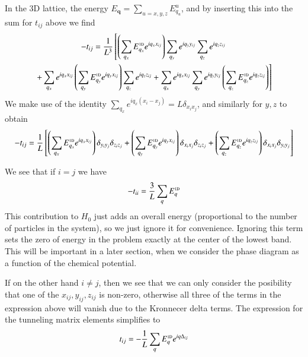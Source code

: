 \documentclass[oneside,11pt]{memoir}
\newcommand{\bv}[1]{\ensuremath{\bm{#1}}}
\begin{document}
In the 3D lattice, the energy $E_{\bv{q}} = \sum_{u=x,y,z} E_{q_{u}}^{u} $, and by inserting this into the sum for $t_{ij}$ above we find 
\begin{multline}
-t_{ij} =  \frac{1}{L^{3}} \left[ 
          \left(\sum_{q_{x}} E_{q_{x}}^{\text{\tiny 1D}}   e^{ i q_{x} x_{ij} }   \right)
          \sum_{q_{y}} e^{ i q_{y} y_{ij} }   
          \sum_{q_{z}} e^{ i q_{z} z_{ij} }  
   \right. \\
\left. 
          + 
          \sum_{q_{x}} e^{ i q_{x} x_{ij} }  
          \left(\sum_{q_{y}} E_{q_{y}}^{\text{\tiny 1D}}   e^{ i q_{y} x_{ij} }   \right)
          \sum_{q_{z}} e^{ i q_{z} z_{ij} }  
          + 
          \sum_{q_{x}} e^{ i q_{x} x_{ij} }  
          \sum_{q_{y}} e^{ i q_{y} y_{ij} }   
          \left(\sum_{q_{z}} E_{q_{z}}^{\text{\tiny 1D}}   e^{ i q_{z} z_{ij} }   \right)
\right]
\end{multline}
We make use of the identity $\sum_{q_{x}} e^{ iq_{x}(x_{i}-x_{j}) } = L \delta_{x_{i}x_{j}}$, and similarly for $y,z$ to obtain
\begin{equation}
-t_{ij} =  \frac{1}{L} \left[ 
          \left(\sum_{q_{x}} E_{q_{x}}^{\text{\tiny 1D}}   e^{ i q_{x} x_{ij} }   \right)
          \delta_{y_{i}y_{j}}
          \delta_{z_{i}z_{j}}
          + 
          \left(\sum_{q_{y}} E_{q_{y}}^{\text{\tiny 1D}}   e^{ i q_{y} x_{ij} }   \right)
          \delta_{x_{i}x_{j}}
          \delta_{z_{i}z_{j}}
          + 
          \left(\sum_{q_{z}} E_{q_{z}}^{\text{\tiny 1D}}   e^{ i q_{z} z_{ij} }   \right)
          \delta_{x_{i}x_{j}}
          \delta_{y_{i}y_{j}}
\right]
\end{equation}

We see that if $i=j$ we have 
\begin{equation}
  -t_{ii} =  \frac{3}{L} 
          \sum_{q} E_{q}^{\text{\tiny 1D}}  
\end{equation}
This contribution to $H_{0}$ just adds an overall energy (proportional to the
number of particles in the system), so we just ignore it for convenience.
Ignoring this term sets the zero of energy in the problem exactly at the center
of the lowest band.  This will be important in a later section, when we
consider the phase diagram as a function of the chemical potential.   

If on the other hand $i\neq j$, then we see that we can only consider the
posibility that one of the $x_{ij}, y_{ij}, z_{ij}$ is non-zero, otherwise all
three of the terms in the expression above will vanish due to the Kronnecer
delta terms.  The expression for the tunneling matrix elements simplifies to 
\begin{equation}
  t_{ij} = -\frac{1}{L} \sum_{q} E_{q}^{\text{\tiny 1D}} e^{iq \Delta_{ij}} 
\label{eq:tunneling3D}
\end{equation}
\end{document}
